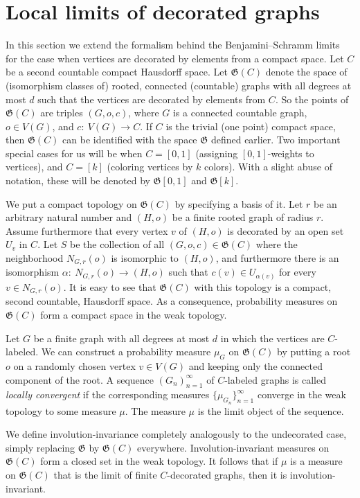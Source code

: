 \documentclass{article}
\def\Gf{\mathfrak{G}}\def\Hf{\mathfrak{H}}\def\If{\mathfrak{I}}
\begin{document}
\section{Local limits of decorated graphs}\label{benschramm}

In this section we extend the formalism behind the Benjamini--Schramm
limits for the case when vertices are decorated by elements from a
compact space. Let $C$ be a second countable compact Hausdorff space.
Let $\Gf(C)$ denote the space of (isomorphism classes of) rooted,
connected (countable) graphs with all degrees at most $d$ such that
the vertices are decorated by elements from $C$. So the points of
$\Gf(C)$ are triples $(G,o,c)$, where $G$ is a connected countable
graph, $o\in V(G)$, and $c:~V(G)\to C$. If $C$ is the trivial (one
point) compact space, then $\Gf(C)$ can be identified with the space
$\Gf$ defined earlier. Two important special cases for us will be
when $C=[0,1]$ (assigning $[0,1]$-weights to vertices), and $C=[k]$
(coloring vertices by $k$ colors). With a slight abuse of notation,
these will be denoted by $\Gf[0,1]$ and $\Gf[k]$.

We put a compact topology on $\Gf(C)$ by specifying a basis of it.
Let $r$ be an arbitrary natural number and $(H,o)$ be a finite rooted
graph of radius $r$. Assume furthermore that every vertex $v$ of
$(H,o)$ is decorated by an open set $U_v$ in $C$. Let $S$ be the
collection of all $(G,o,c)\in\Gf(C)$ where the neighborhood
$N_{G,r}(o)$ is isomorphic to $(H,o)$, and furthermore there is an
isomorphism $\alpha:~N_{G,r}(o)\rightarrow (H,o)$ such that $c(v) \in
U_{\alpha(v)}$ for every $v\in N_{G,r}(o)$. It is easy to see that
$\Gf(C)$ with this topology is a compact, second countable, Hausdorff
space. As a consequence, probability measures on $\Gf(C)$ form a
compact space in the weak topology.


Let $G$ be a finite graph with all degrees at most $d$ in which the
vertices are $C$-labeled. We can construct a probability measure
$\mu_{G}$ on $\Gf(C)$ by putting a root $o$ on a randomly chosen
vertex $v\in V(G)$ and keeping only the connected component of the
root. A sequence $(G_n)_{n=1}^\infty$ of $C$-labeled graphs is called
\emph{locally convergent} if the corresponding measures
$\{\mu_{G_n}\}_{n=1}^\infty$ converge in the weak topology to some
measure $\mu$. The measure $\mu$ is the limit object of the sequence.

We define involution-invariance completely analogously to the
undecorated case, simply replacing $\Gf$ by $\Gf(C)$ everywhere.
Involution-invariant measures on $\Gf(C)$ form a closed set in the
weak topology. It follows that if $\mu$ is a measure on $\Gf(C)$ that
is the limit of finite $C$-decorated graphs, then it is
involution-invariant.
\end{document}
